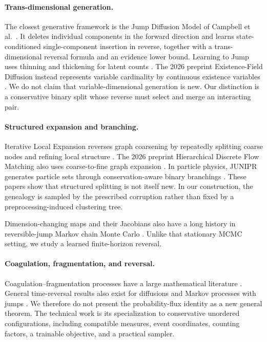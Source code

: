 \documentclass[10pt]{article}
\theoremstyle{definition}
\theoremstyle{remark}
\begin{document}
\paragraph{Trans-dimensional generation.}
The closest generative framework is the Jump Diffusion Model of
Campbell et al.\ \cite{campbell2023transdimensional}.  It deletes individual components in the forward direction and learns state-conditioned single-component insertion in reverse, together with a trans-dimensional reversal formula and an evidence lower bound.  Learning to Jump uses thinning and thickening for latent counts \cite{chen2023learning}.  The 2026 preprint Existence-Field Diffusion instead represents variable cardinality by continuous existence variables \cite{pan2026existence}.  We do not claim that variable-dimensional generation is new.  Our distinction is a conservative binary split whose reverse must select and merge an interacting pair.

\paragraph{Structured expansion and branching.}
Iterative Local Expansion reverses graph coarsening by repeatedly splitting coarse nodes and refining local structure \cite{bergmeister2024efficient}.  The 2026 preprint Hierarchical Discrete Flow Matching also uses coarse-to-fine graph expansion \cite{boget2026hierarchical}.  In particle physics, JUNIPR generates particle sets through conservation-aware binary branchings \cite{andreassen2019junipr}.  These papers show that structured splitting is not itself new.  In our construction, the genealogy is sampled by the prescribed corruption rather than fixed by a preprocessing-induced clustering tree.

Dimension-changing maps and their Jacobians also have a long history in
reversible-jump Markov chain Monte Carlo \cite{green1995reversible}.  Unlike
that stationary MCMC setting, we study a learned finite-horizon reversal.

\paragraph{Coagulation, fragmentation, and reversal.}
Coagulation--fragmentation processes have a large mathematical literature
\cite{aldous1999deterministic,norris1999smoluchowski,bertoin2006random}.  General time-reversal results also exist for diffusions and Markov processes with jumps
\cite{anderson1982reverse,conforti2022time}.  We therefore do not present the probability-flux identity as a new general theorem.  The technical work is its specialization to conservative unordered configurations, including compatible measures, event coordinates, counting factors, a trainable objective, and a practical sampler.
\end{document}
